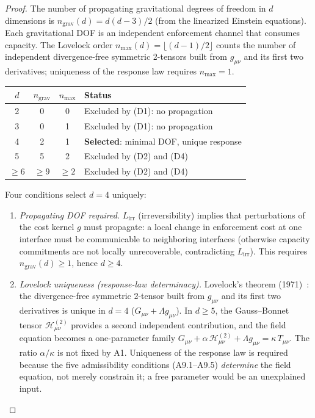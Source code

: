 \documentclass[11pt,a4paper]{article}
\theoremstyle{definition}
\begin{document}
\begin{proof}
The number of propagating gravitational degrees of freedom in $d$
dimensions is $n_{\mathrm{grav}}(d) = d(d-3)/2$ (from the linearized
Einstein equations).  Each gravitational DOF is an independent
enforcement channel that consumes capacity.  The Lovelock order
$n_{\max}(d) = \lfloor (d-1)/2 \rfloor$ counts the number of
independent divergence-free symmetric 2-tensors built from
$g_{\mu\nu}$ and its first two derivatives; uniqueness of the response
law requires $n_{\max} = 1$.

\smallskip
\begin{center}\small
\begin{tabular}{@{}cccl@{}}
\toprule
$d$ & $n_{\mathrm{grav}}$ & $n_{\max}$ & Status \\
\midrule
2 & 0 & 0 & Excluded by (D1): no propagation \\
3 & 0 & 1 & Excluded by (D1): no propagation \\
4 & 2 & 1 & \textbf{Selected}: minimal DOF, unique response \\
5 & 5 & 2 & Excluded by (D2) and (D4) \\
$\ge 6$ & $\ge 9$ & $\ge 2$ & Excluded by (D2) and (D4) \\
\bottomrule
\end{tabular}
\end{center}

\smallskip\noindent Four conditions select $d = 4$ uniquely:
\begin{enumerate}[label=(D\arabic*),nosep]
  \item \textit{Propagating DOF required.}  $L_{\mathrm{irr}}$
  (irreversibility) implies that perturbations of the cost kernel $g$
  must propagate: a local change in enforcement cost at one interface
  must be communicable to neighboring interfaces (otherwise capacity
  commitments are not locally unrecoverable, contradicting
  $L_{\mathrm{irr}}$).  This requires $n_{\mathrm{grav}}(d) \ge 1$,
  hence $d \ge 4$.

  \item \textit{Lovelock uniqueness (response-law determinacy).}
  Lovelock's theorem (1971)~\cite{Lovelock1971}: the divergence-free
  symmetric 2-tensor built from $g_{\mu\nu}$ and its first two
  derivatives is unique in $d = 4$ ($G_{\mu\nu} + \Lambda
  g_{\mu\nu}$).  In $d \ge 5$, the Gauss--Bonnet tensor
  $\mathcal{H}^{(2)}_{\mu\nu}$ provides a second independent
  contribution, and the field equation becomes a one-parameter family
  $G_{\mu\nu} + \alpha\,\mathcal{H}^{(2)}_{\mu\nu} + \Lambda
  g_{\mu\nu} = \kappa\,T_{\mu\nu}$.  The ratio
  $\alpha/\kappa$ is not fixed by A1.  Uniqueness of the response law
  is required because the five admissibility conditions
  (A9.1--A9.5) \emph{determine} the field equation, not merely
  constrain it; a free parameter would be an unexplained input.


\end{enumerate}
\end{proof}
\end{document}
